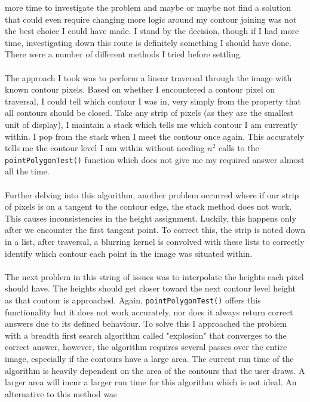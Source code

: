 \documentclass[11pt]{article}
\begin{document}
more time to investigate the problem and maybe or maybe not find a solution
that could even require changing more logic around my contour joining was
not the best choice I could have made. I stand by the decision, though if
I had more time, investigating down this route is definitely something I should
have done. There were a number of different methods I tried before
settling.\\
\\
The approach I took was to perform a linear traversal through
the image with known contour pixels. Based on whether I encountered a 
contour pixel on traversal, I could tell which contour I was in, very simply
from the property that all contours should be closed. Take any strip 
of pixels (as they are the smallest unit of display), I maintain a stack which
tells me which contour I am currently within. I pop from the stack when I
meet the contour once again. This accurately tells me the contour level I am
within without needing $n^2$ calls to the \texttt{pointPolygonTest()} function
which does not give me my required answer almost all the time.\\
\\
Further delving into this algorithm, another problem occurred where
if our strip of pixels is on a tangent to the contour edge, the stack method
does not work. This causes inconsistencies in the height assignment. Luckily,
this happens only after we encounter the first tangent point. To correct this,
the strip is noted down in a list, after traversal, a blurring kernel is
convolved with these lists to correctly identify which contour each point
in the image was situated within.\\
\\
The next problem in this string of issues was to interpolate the heights
each pixel should have. The heights should get closer toward the next 
contour level height as that contour is approached. Again, 
\texttt{pointPolygonTest()} offers this functionality but it does not work
accurately, nor does it always return correct answers due to its defined
behaviour. To solve this I approached the problem with a breadth first 
search algorithm called "explosion"
that converges to the correct answer, however, the algorithm
requires several passes over the entire image, especially if the 
contours have a large area. The 
current run time of the algorithm is heavily dependent on the area
of the contours that the user draws. A larger area will incur a larger
run time for this algorithm which is not ideal. 
An alternative to this method was
\end{document}
